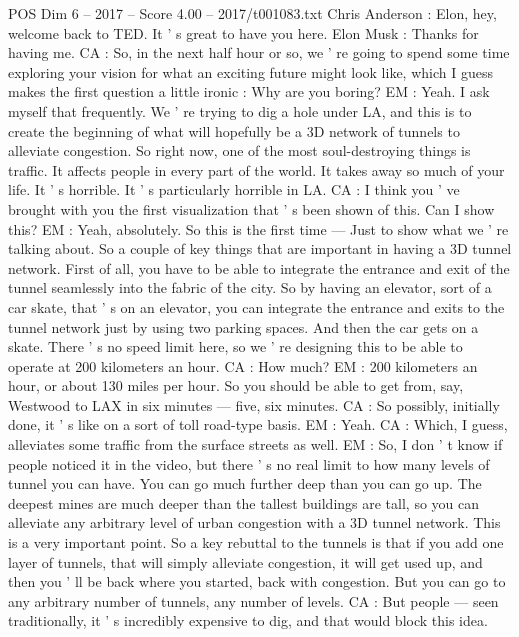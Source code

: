 \begin{textsample}{POS Dim 6 – 2017 – Score 4.00 – 2017/t001083.txt}  \label{ex:f6_pos_059}
Chris Anderson : Elon, hey, welcome back to TED.
It ' s great to have you here.
Elon Musk : Thanks for having me.
CA : So, in the next half hour or so, we ' re going to spend some time exploring your vision for what an exciting future might look like, which I guess makes the first question a little ironic : Why are you boring?
EM : Yeah.
I ask myself that frequently.
We ' re trying to dig a hole under LA, and this is to create the beginning of what will hopefully be a 3D network of tunnels to alleviate congestion.
So right now, one of the most soul-destroying things is traffic.
It affects people in every part of the world.
It takes away so much of your life.
It ' s horrible.
It ' s particularly horrible in LA.
CA : I think you ' ve brought with you the first visualization that ' s been shown of this.
Can I show this?
EM : Yeah, absolutely.
So this is the first time — Just to show what we ' re talking about.
So a couple of key things that are important in having a 3D tunnel network.
First of all, you have to be able to integrate the entrance and exit of the tunnel seamlessly into the fabric of the city.
So by having an elevator, sort of a car skate, that ' s on an elevator, you can integrate the entrance and exits to the tunnel network just by using two parking spaces.
And then the car gets on a skate.
There ' s no speed limit here, so we ' re designing this to be able to operate at 200 kilometers an hour.
CA : How much?
EM : 200 kilometers an hour, or about 130 miles per hour.
So you should be able to get from, say, Westwood to LAX in six minutes — five, six minutes.
CA : So possibly, initially done, it ' s like on a sort of toll road-type basis.
EM : Yeah.
CA : Which, I guess, alleviates some traffic from the surface streets as well.
EM : So, I don ' t know if people noticed it in the video, but there ' s no real limit to how many levels of tunnel you can have.
You can go much further deep than you can go up.
The deepest mines are much deeper than the tallest buildings are tall, so you can alleviate any arbitrary level of urban congestion with a 3D tunnel network.
This is a very important point.
So a key rebuttal to the tunnels is that if you add one layer of tunnels, that will simply alleviate congestion, it will get used up, and then you ' ll be back where you started, back with congestion.
But you can go to any arbitrary number of tunnels, any number of levels.
CA : But people — seen traditionally, it ' s incredibly expensive to dig, and that would block this idea.

\end{textsample}
